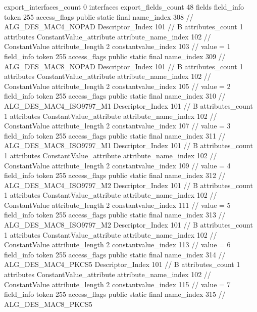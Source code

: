 {{{{			}
			export_interfaces_count	0
			interfaces {
			}
			export_fields_count	48
			fields {
			field_info {
				token	255
				access_flags	public static final
				name_index	308		// ALG_DES_MAC4_NOPAD
				Descriptor_Index	101		// B
				attributes_count	1
				attributes {
				ConstantValue_attribute {
					attribute_name_index	102		// ConstantValue
					attribute_length	2
					constantvalue_index	103		// value = 1
				}
				}
			}
			field_info {
				token	255
				access_flags	public static final
				name_index	309		// ALG_DES_MAC8_NOPAD
				Descriptor_Index	101		// B
				attributes_count	1
				attributes {
				ConstantValue_attribute {
					attribute_name_index	102		// ConstantValue
					attribute_length	2
					constantvalue_index	105		// value = 2
				}
				}
			}
			field_info {
				token	255
				access_flags	public static final
				name_index	310		// ALG_DES_MAC4_ISO9797_M1
				Descriptor_Index	101		// B
				attributes_count	1
				attributes {
				ConstantValue_attribute {
					attribute_name_index	102		// ConstantValue
					attribute_length	2
					constantvalue_index	107		// value = 3
				}
				}
			}
			field_info {
				token	255
				access_flags	public static final
				name_index	311		// ALG_DES_MAC8_ISO9797_M1
				Descriptor_Index	101		// B
				attributes_count	1
				attributes {
				ConstantValue_attribute {
					attribute_name_index	102		// ConstantValue
					attribute_length	2
					constantvalue_index	109		// value = 4
				}
				}
			}
			field_info {
				token	255
				access_flags	public static final
				name_index	312		// ALG_DES_MAC4_ISO9797_M2
				Descriptor_Index	101		// B
				attributes_count	1
				attributes {
				ConstantValue_attribute {
					attribute_name_index	102		// ConstantValue
					attribute_length	2
					constantvalue_index	111		// value = 5
				}
				}
			}
			field_info {
				token	255
				access_flags	public static final
				name_index	313		// ALG_DES_MAC8_ISO9797_M2
				Descriptor_Index	101		// B
				attributes_count	1
				attributes {
				ConstantValue_attribute {
					attribute_name_index	102		// ConstantValue
					attribute_length	2
					constantvalue_index	113		// value = 6
				}
				}
			}
			field_info {
				token	255
				access_flags	public static final
				name_index	314		// ALG_DES_MAC4_PKCS5
				Descriptor_Index	101		// B
				attributes_count	1
				attributes {
				ConstantValue_attribute {
					attribute_name_index	102		// ConstantValue
					attribute_length	2
					constantvalue_index	115		// value = 7
				}
				}
			}
			field_info {
				token	255
				access_flags	public static final
				name_index	315		// ALG_DES_MAC8_PKCS5
}}}}}
